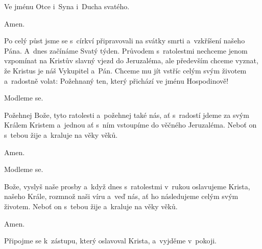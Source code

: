 \mbox{}

\Vbardot{} Ve jménu Otce \grecross{} i~Syna i~Ducha svatého.

\Rbardot{} Amen.

Po celý půst jsme se s~církví připravovali na svátky smrti a~vzkříšení našeho Pána. A~dnes začínáme Svatý týden. Průvodem s~ratolestmi nechceme jenom vzpomínat na Kristův slavný vjezd do Jeruzaléma, ale především chceme vyznat, že Kristus je náš Vykupitel a~Pán. Chceme mu jít vstříc celým svým životem a~radostně volat: Požehnaný ten, který přichází ve jménu Hospodinově!

\mbox{}

Modleme se.

Požehnej \grecross{} Bože, tyto ratolesti a~požehnej také nás, ať s~radostí jdeme za svým Králem Kristem a~jednou ať s~ním vstoupíme do věčného Jeruzaléma. Neboť on s~tebou žije a~kraluje na věky věků.

\Rbardot{} Amen.

\mbox{}

Modleme se.

Bože, vyslyš naše prosby a~když dnes s~ratolestmi v~rukou oslavujeme Krista, našeho Krále, rozmnož naši víru a~veď nás, ať ho následujeme celým svým životem. Neboť on s~tebou žije a~kraluje na věky věků.

\Rbardot{} Amen.

\mbox{}

Připojme se k~zástupu, který oslavoval Krista, a~vyjděme v~pokoji.
